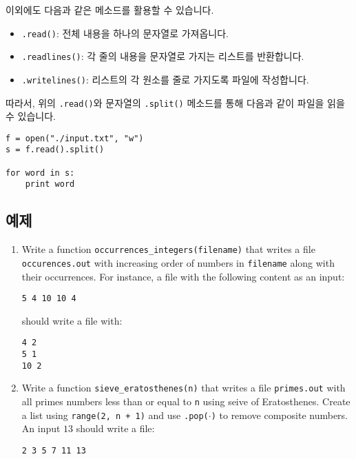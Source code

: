 \documentclass[../main.tex]{subfiles}
\begin{document}
이외에도 다음과 같은 메소드를 활용할 수 있습니다.
\begin{itemize}
    \item \texttt{.read()}: 전체 내용을 하나의 문자열로 가져옵니다.
    \item \texttt{.readlines()}: 각 줄의 내용을 문자열로 가지는 리스트를 반환합니다.
    \item \texttt{.writelines()}: 리스트의 각 원소를 줄로 가지도록 파일에 작성합니다.
\end{itemize}
따라서, 위의 \texttt{.read()}와 문자열의 \texttt{.split()} 메소드를 통해 다음과 같이 파일을 읽을 수 있습니다.
\begin{verbatim}
f = open("./input.txt", "w")
s = f.read().split()

for word in s:
    print word
\end{verbatim}


\subsection{예제}
\begin{enumerate}
\item Write a function \texttt{occurrences\_integers(filename)} that writes a file \texttt{occurences.out} with increasing order of numbers in \texttt{filename} along with their occurrences.
For instance, a file with the following content as an input:
\begin{verbatim}
5 4 10 10 4
\end{verbatim}
should write a file with:
\begin{verbatim}
4 2
5 1
10 2
\end{verbatim}

\item Write a function \texttt{sieve\_eratosthenes(n)} that writes a file \texttt{primes.out} with all primes numbers less than or equal to \texttt{n} using seive of Eratosthenes.
Create a list using \texttt{range(2, n + 1)} and use \texttt{.pop($\cdot$)} to remove composite numbers.
An input $13$ should write a file:
\begin{verbatim}
2 3 5 7 11 13
\end{verbatim}
\end{enumerate}
\end{document}
